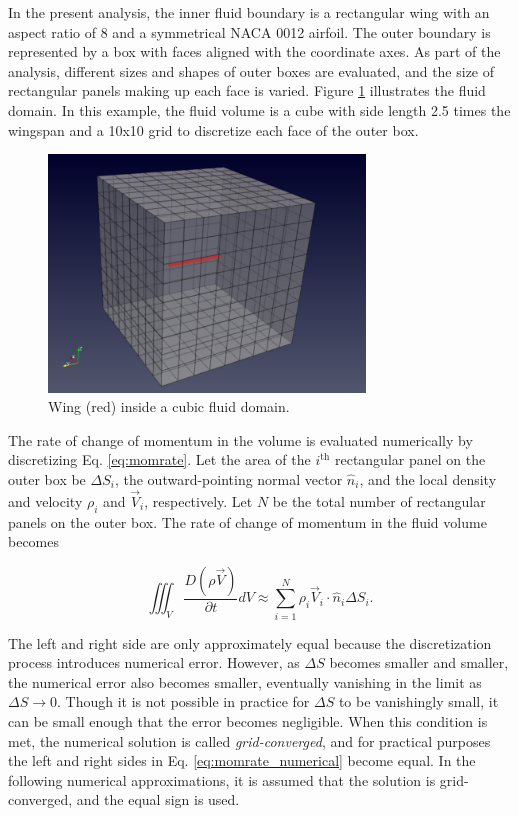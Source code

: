\documentclass[11pt]{article}
\begin{document}
In the present analysis, the inner fluid boundary is
a rectangular wing with an aspect ratio of 8 and a symmetrical NACA 0012
airfoil. The outer boundary is represented by a box with faces aligned with the
coordinate axes. As part of the analysis, different sizes and shapes of outer
boxes are evaluated, and the size of rectangular panels making up each face is
varied. Figure \ref{fig:domain} illustrates the fluid domain. In this example,
the fluid volume is a cube with side length 2.5 times
the wingspan and a 10x10 grid to discretize each face of the outer box.

\begin{figure}
\centering
  \includegraphics[width=0.75\textwidth]{images/domain.png}
\caption{Wing (red) inside a cubic fluid domain.}
\label{fig:domain}
\end{figure}

The rate of change of momentum in the volume is evaluated numerically by
discretizing Eq.
\ref{eq:momrate}. Let the area of the $i^\text{th}$ rectangular panel on the
outer box be $\Delta S_i$, the outward-pointing normal vector $\hat{n}_i$, and
the local density and velocity $\rho_i$ and $\vec{V}_i$, respectively. Let $N$
be the total number of rectangular panels on the outer box. The rate of change
of momentum in the fluid volume becomes

\begin{equation}
\iiint_V\frac{D(\rho\vec{V})}{\partial t}dV \approx 
\sum_{i=1}^N \rho_i\vec{V}_i\cdot\hat{n}_i\Delta S_i.
\label{eq:momrate_numerical}
\end{equation}

The left and right side are only approximately equal because the discretization
process introduces numerical error. However, as $\Delta S$ becomes smaller and
smaller, the numerical error also becomes smaller, eventually vanishing in the
limit as $\Delta S \rightarrow 0$. Though it is not possible in practice for
$\Delta S$ to be vanishingly small, it can be small enough that the error
becomes negligible. When this condition is met, the numerical solution is called
\textit{grid-converged}, and for practical purposes the left and right sides in
Eq. \ref{eq:momrate_numerical} become equal. In the following numerical
approximations, it is assumed that the solution is grid-converged, and the
equal sign is used.
\end{document}
